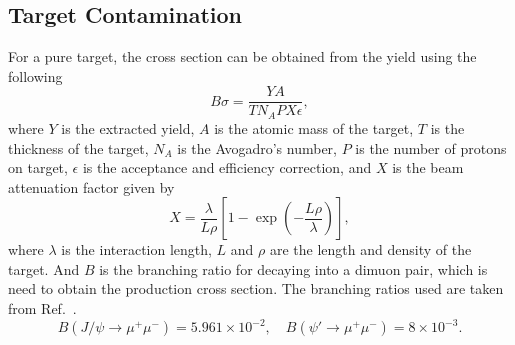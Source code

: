 \documentclass[../main.tex]{subfiles}
\begin{document}
\subsection{Target Contamination}
\label{subsec:contamination}
For a pure target, the cross section can be obtained from the yield using the following
\begin{equation}
	B\sigma = \frac{Y A}{T N_A P X \epsilon},
\end{equation}
where $Y$ is the extracted yield, $A$ is the atomic mass of the target,
$T$ is the thickness of the target, $N_A$ is the Avogadro's number,
$P$ is the number of protons on target, $\epsilon$ is the acceptance and efficiency correction,
and $X$ is the beam attenuation factor given by
\begin{equation}
	X=\frac{\lambda}{L\rho} \left[1-\exp\left(-\frac{L\rho}{\lambda}\right)\right],
\end{equation}
where $\lambda$ is the interaction length, $L$ and $\rho$ are the length and density
of the target. And $B$ is the branching ratio for decaying into a dimuon pair, which is need
to obtain the production cross section. The branching ratios used are taken from Ref.~\cite{workman2022}.
\begin{equation}
	B\left(J/\psi\to\mu^+\mu^-\right)=5.961\times 10^{-2},\quad B\left(\psi'\to\mu^+\mu^-\right)=8\times 10^{-3}.
\end{equation}
\end{document}
